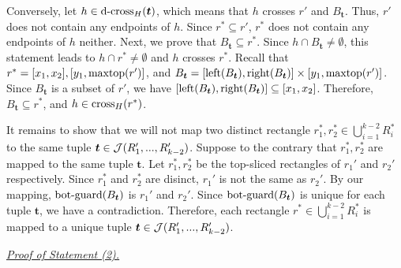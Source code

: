 \vgap 

Conversely, let $h\in \mathrm{d\text{-}cross}_H(\textrm{\boldmath${t}$})$, which means that $h$ crosses $r'$ and $B_{\bm{t}}$. Thus, $r'$ does not contain any endpoints of $h$. Since $r^*\subseteq r'$, $r^*$ does not contain any endpoints of $h$ neither. 
Next, we prove that $B_{\bm{t}} \subseteq r^*$. Since $h \cap B_{\bm{t}}\neq \emptyset$, this statement leads to $h \cap r^* \neq \emptyset$ and $h$ crosses $r^*$. Recall that $r^* = [x_1,x_2], [y_1, \mathrm{maxtop}(r')]$, and $B_{\textrm{\boldmath${t}$}} = [\mathrm{left}(B_{\textrm{\boldmath${t}$}}), \mathrm{right}(B_{\textrm{\boldmath${t}$}})]\times [y_1,\mathrm{maxtop}(r')]$. Since $B_{\bm{t}}$ is a subset of $r'$, we have $[\mathrm{left}(B_{\textrm{\boldmath${t}$}}), \mathrm{right}(B_{\textrm{\boldmath${t}$}})] \subseteq [x_1,x_2]$. Therefore, $B_{\bm{t}} \subseteq r^*$, and $h\in \mathrm{cross}_H(r^*)$. 

\vgap 

It remains to show that we will not map two distinct rectangle $r_1^*, r_2^*\in \bigcup_{i = 1}^{k-2}R_i^*$ to the same tuple $\textrm{\boldmath${t}$}\in \mathcal{J}(R_1',...,R_{k-2}')$. Suppose to the contrary that $r_1^*, r_2^*$ are mapped to the same tuple $\bm{t}$. Let $r_1^*, r_2^*$ be the top-sliced rectangles of $r_1'$ and $r_2'$ respectively. Since $r_1^*$ and $r_2^*$ are disinct, $r_1'$ is not the same as $r_2'$. By our mapping, $\mathrm{bot\text{-}guard}(B_{\textrm{\boldmath${t}$}})$ is $r_1'$ and $r_2'$. Since $\mathrm{bot\text{-}guard}(B_{\textrm{\boldmath${t}$}})$ is unique for each tuple $\bm{t}$, we have a contradiction. Therefore, each rectangle $r^*\in \bigcup_{i = 1}^{k-2}R_i^*$ is mapped to a unique tuple $\textrm{\boldmath${t}$}\in \mathcal{J}(R_1',...,R_{k-2}')$.

\noindent \underline{\em Proof of Statement (2).} 
